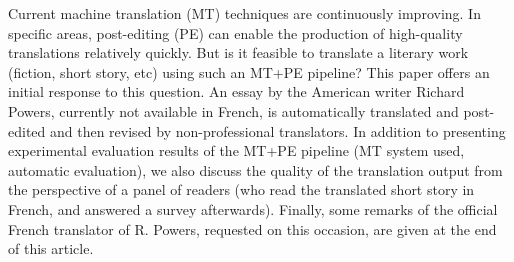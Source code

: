 Current machine translation (MT) techniques are continuously improving. In specific areas, post-editing (PE) can enable the production of high-quality translations relatively quickly. But is it feasible to translate a literary work (fiction, short story, etc) using such an MT+PE pipeline? This paper offers an initial response to this question. An essay by the American writer Richard Powers, currently not available in French, is automatically translated and post-edited and then revised by non-professional translators. In addition to presenting experimental evaluation results of the MT+PE pipeline (MT system used, automatic evaluation), we also discuss the quality of the translation output from the perspective of a panel of readers (who read the translated short story in French, and answered a survey afterwards). Finally, some remarks of the official French translator of R. Powers, requested on this occasion, are given at the end of this article.
